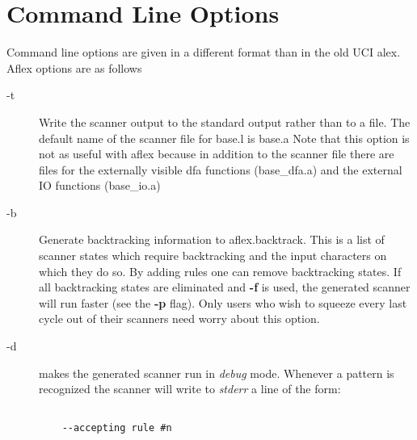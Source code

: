 \newpage
\section{Command Line Options}
Command line options are given in a different format than in the
old UCI alex.  Aflex options are as follows
\begin{description}
\item[-t]
Write the scanner output to the standard output rather than to a file.
The default name of the scanner file for base.l is base.a  Note that this
option is not as useful with aflex because in addition to the scanner
file there are files for the externally visible dfa functions
(base\_dfa.a) and the external IO functions (base\_io.a)
\item[-b]
Generate backtracking information to
{\it} aflex.backtrack.
This is a list of scanner states which require backtracking
and the input characters on which they do so.  By adding rules one
can remove backtracking states.  If all backtracking states
are eliminated and
{\bf -f}
is used, the generated scanner will run faster (see the
{\bf -p}
flag).  Only users who wish to squeeze every last cycle out of their
scanners need worry about this option.
\item[-d]
makes the generated scanner run in
{\it debug}
mode.  Whenever a pattern is recognized the scanner will
write to
{\it stderr}
a line of the form:
\begin{verbatim}

    --accepting rule #n


\end{verbatim}
\end{description}
